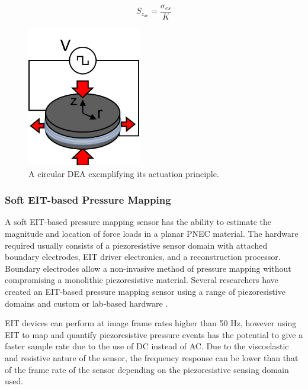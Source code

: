 	\begin{equation}
		S_{z_{de}} = \frac{\sigma_{es}}{K}
		\label{eqn:DEA_strain_z}
	\end{equation}
	\begin{figure}[H]
		\centering
		\includegraphics[width=5cm]{Figures/circ_DEA_v2.jpg} %
        \vspace{0.2cm}
		\caption{A circular DEA exemplifying its actuation principle.}
		\label{fig:DEA_diagram}
	\end{figure}
	
	\subsubsection{Soft EIT-based Pressure Mapping}
	\label{subsubsec:eit-based_pressure_mapping}
	A soft EIT-based pressure mapping sensor has the ability to estimate the magnitude and location of force loads in a planar PNEC material. The hardware required usually consists of a piezoresistive sensor domain with attached boundary electrodes, EIT driver electronics, and a reconstruction processor. Boundary electrodes allow a non-invasive method of pressure mapping without compromising a monolithic piezoresistive material. Several researchers have created an EIT-based pressure mapping sensor using a range of piezoresistive domains and custom or lab-based hardware \cite{Russo2017, Nagakubo2007, Silvera-Tawil2015, Yoon2017, Sun2020, Ellingham2024}.
	
    EIT devices can perform at image frame rates higher than 50 Hz, however using EIT to map and quantify piezoresistive pressure events has the potential to give a faster sample rate due to the use of DC instead of AC. Due to the viscoelastic and resistive nature of the sensor, the frequency response can be lower than that of the frame rate of the sensor depending on the piezoresistive sensing domain used. 
 
